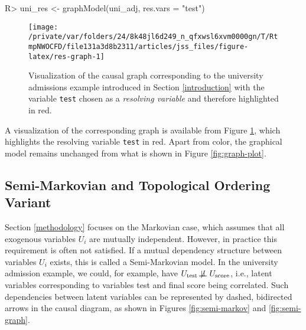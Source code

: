\documentclass[
  nojss]{jss}
\begin{document}
\begin{CodeChunk}
\begin{CodeInput}
R> uni_res <- graphModel(uni_adj, res.vars = "test")
\end{CodeInput}
\end{CodeChunk}

\begin{CodeChunk}
\begin{figure}

{\centering \texttt{[image: /private/var/folders/24/8k48jl6d249\_n\_qfxwsl6xvm0000gn/T/RtmpNWOCFD/file131a3d8b2311/articles/jss\_files/figure-latex/res-graph-1]} 

}

\caption[Visualization of the causal graph corresponding to the university admissions example introduced in Section \ref{introduction} with the variable \texttt{test} chosen as a \textit{resolving variable} and therefore highlighted in red]{Visualization of the causal graph corresponding to the university admissions example introduced in Section \ref{introduction} with the variable \texttt{test} chosen as a \textit{resolving variable} and therefore highlighted in red.}\label{fig:res-graph}
\end{figure}
\end{CodeChunk}

A visualization of the corresponding graph is available from Figure
\ref{fig:res-graph}, which highlights the resolving variable
\texttt{test} in red. Apart from color, the graphical model remains
unchanged from what is shown in Figure \ref{fig:graph-plot}.

\hypertarget{semi-markovian-and-topological-ordering-variant}{%
\subsection{Semi-Markovian and Topological Ordering
Variant}\label{semi-markovian-and-topological-ordering-variant}}

Section \ref{methodology} focuses on the Markovian case, which assumes
that all exogenous variables \(U_i\) are mutually independent. However,
in practice this requirement is often not satisfied. If a mutual
dependency structure between variables \(U_i\) exists, this is called a
Semi-Markovian model. In the university admission example, we could, for
example, have
\(U_{\text{test}} \not\!\perp\!\!\!\perp U_{\text{score}}\), i.e.,
latent variables corresponding to variables test and final score being
correlated. Such dependencies between latent variables can be
represented by dashed, bidirected arrows in the causal diagram, as shown
in Figures \ref{fig:semi-markov} and \ref{fig:semi-graph}.
\end{document}
